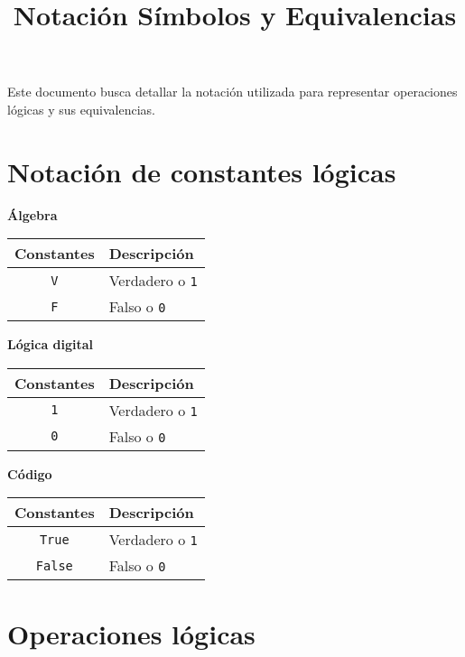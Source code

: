 \documentclass[a4paper,10pt]{article}
\title{\vspace{-13mm}Notación Símbolos y Equivalencias\vspace{-13mm}}
\date{}
\begin{document}
\maketitle

Este documento busca detallar la notación utilizada para representar operaciones lógicas y sus equivalencias.

\section*{Notación de constantes lógicas}

\begin{multicols}{3}
    \begin{center}
    \textbf{Álgebra}\\
    \begin{tabular}{c|p{2.15cm}}
    \small Constantes & \small Descripción\\
    \hline
    \verb|V|  & \small Verdadero o \verb|1|\\
    \verb|F|  & \small Falso o \verb|0|\\
    \end{tabular}
    \end{center}
\columnbreak
    \begin{center}
    \textbf{Lógica digital}\\
    \begin{tabular}{c|p{2.15cm}}
    \small Constantes & \small Descripción\\
    \hline
    \verb|1|              & \small Verdadero o \verb|1|\\
    \verb|0|              & \small Falso o \verb|0|\\
    \end{tabular}
    \end{center}
\columnbreak
    \begin{center}
    \textbf{Código}\\
    \begin{tabular}{c|p{2.15cm}}
    \small Constantes & \small Descripción\\
    \hline
    \verb|True|   & \small Verdadero o \verb|1|\\
    \verb|False|  & \small Falso o \verb|0|\\
    \end{tabular}
    \end{center}
\end{multicols}
    
\section*{Operaciones lógicas}
\end{document}
